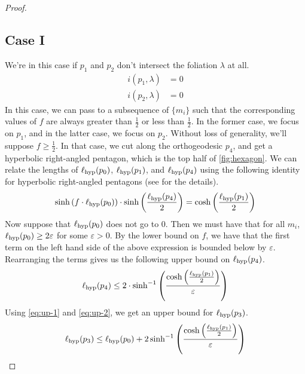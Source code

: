 \documentclass[12pt, reqno]{amsart}
\begin{document}
\begin{proof}
\subsection*{Case I}
\label{case1}
We're in this case if $p_1$ and $p_2$ don't intersect the foliation $\lambda$ at all.
\begin{align*}
  i(p_1, \lambda) &= 0 \\
  i(p_2, \lambda) &= 0
\end{align*}
In this case, we can pass to a subsequence of $\{m_i\}$ such that the corresponding values of $f$ are always greater than $\frac{1}{2}$ or less than $\frac{1}{2}$.
In the former case, we focus on $p_1$, and in the latter case, we focus on $p_2$.
Without loss of generality, we'll suppose $f \geq \frac{1}{2}$.
In that case, we cut along the orthogeodesic $p_4$, and get a hyperbolic right-angled pentagon, which is the top half of \autoref{fig:hexagon}.
We can relate the lengths of $\ell_{\mathrm{hyp}}(p_0)$, $\ell_{\mathrm{hyp}}(p_1)$, and $\ell_{\mathrm{hyp}}(p_4)$ using the following identity for hyperbolic right-angled pentagons (see \cite{thurston1979geometry} for the details).
\begin{align}
  \label{eq:pentagon}
  \sinh\left( f \cdot \ell_{\mathrm{hyp}}(p_0) \right)  \cdot \sinh\left( \frac{\ell_{\mathrm{hyp}}(p_4)}{2} \right)  = \cosh\left( \frac{\ell_{\mathrm{hyp}}(p_1)}{2} \right)
\end{align}
Now suppose that $\ell_{\mathrm{hyp}}(p_0)$ does not go to $0$.
Then we must have that for all $m_i$, $\ell_{\mathrm{hyp}}(p_0) \geq 2\varepsilon$ for some $\varepsilon > 0$. By the lower bound on $f$, we have that the first term on the left hand side of the above expression is bounded below by $\varepsilon$.
Rearranging the terms gives us the following upper bound on $\ell_{\mathrm{hyp}}(p_4)$.
\begin{equation}
  \label{eq:up-2}
  \ell_{\mathrm{hyp}}(p_4) \leq 2 \cdot \sinh^{-1} \left( \frac{\cosh \left( \frac{\ell_{\mathrm{hyp}}(p_1)}{2} \right)}{\varepsilon} \right)
\end{equation}
Using \eqref{eq:up-1} and \eqref{eq:up-2}, we get an upper bound for $\ell_{\mathrm{hyp}}(p_3)$.
\begin{equation}
  \label{eq:up-3}
  \ell_{\mathrm{hyp}}(p_3) \leq \ell_{\mathrm{hyp}}(p_0) +
  2 \sinh^{-1} \left( \frac{\cosh \left( \frac{\ell_{\mathrm{hyp}}(p_1)}{2} \right)}{\varepsilon} \right)
\end{equation}


\end{proof}
\end{document}
